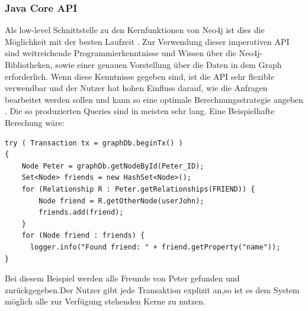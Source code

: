 \subsubsection{Java Core API}
Als low-level Schnittstelle zu den Kernfunktionen von Neo4j ist dies die Möglichkeit mit der besten Laufzeit \parencite{vukotic2015neo4j}. Zur Verwendung dieser imperativen API sind weitreichende Programmierkenntnisse und Wissen über die Neo4j-Bibliotheken, sowie einer genauen Vorstellung über die Daten in dem Graph erforderlich. Wenn diese Kenntnisse gegeben sind, ist die API sehr flexible verwendbar  und der Nutzer hat hohen Einfluss darauf, wie die Anfragen bearbeitet werden sollen und kann so eine optimale Berechnungsstrategie angeben \parencite{vukotic2015neo4j}. Die so produzierten Queries sind in meisten sehr lang. Eine Beispielhafte Berechung wäre:
\begin{Verbatim}[frame=single]
try ( Transaction tx = graphDb.beginTx() )
{
	Node Peter = graphDb.getNodeById(Peter_ID);
	Set<Node> friends = new HashSet<Node>();
	for (Relationship R : Peter.getRelationships(FRIEND)) {  
		Node friend = R.getOtherNode(userJohn);
		friends.add(friend);                        
	}
	for (Node friend : friends) {
	  logger.info("Found friend: " + friend.getProperty("name")); 
}

\end{Verbatim}
Bei diesem Beispiel werden alle Freunde von Peter gefunden und zurückgegeben.Der Nutzer gibt jede Transaktion explizit an,so ist es dem System möglich alle zur Verfügung stehenden Kerne zu nutzen.

